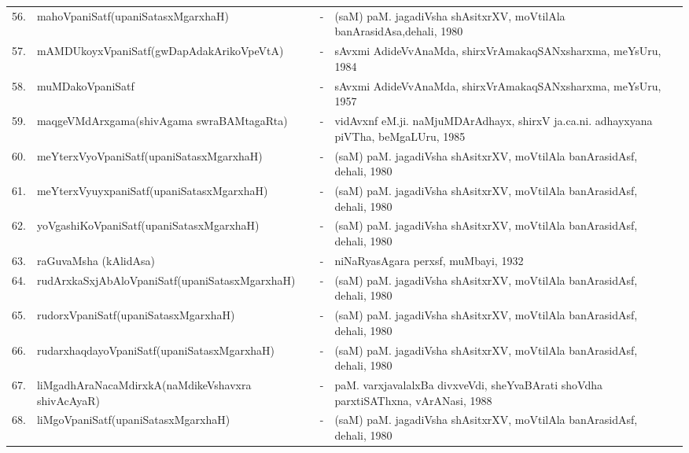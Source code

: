 {\begin{longtable}{lp{5cm}cp{5cm}<{\raggedright}p{3cm}<{\raggedright}@{}}
56. & mahoVpaniSatf\newline (upaniSatasxMgarxhaH) &-& (saM) paM. jagadiVsha shAsitxrXV, moVtilAla banArasidAsa,\newline dehali, 1980\\
57. & mAMDUkoyxVpaniSatf\newline (gwDapAdakArikoVpeVtA) &-& sAvxmi AdideVvAnaMda, shirxVrAmakaqSANxsharxma, meYsUru, 1984\\
58. & muMDakoVpaniSatf &-& sAvxmi AdideVvAnaMda, shirxVrAmakaqSANxsharxma, meYsUru, 1957\\
59. & maqgeVMdArxgama\newline (shivAgama swraBAMtagaRta) &-& vidAvxnf eM.ji. naMjuMDArAdhayx, shirxV ja.ca.ni. adhayxyana piVTha, beMgaLUru, 1985\\
60. & meYterxVyoVpaniSatf\newline (upaniSatasxMgarxhaH) &-& (saM) paM. jagadiVsha shAsitxrXV, moVtilAla banArasidAsf, dehali, 1980\\
61. & meYterxVyuyxpaniSatf\newline (upaniSatasxMgarxhaH) &-& (saM) paM. jagadiVsha shAsitxrXV, moVtilAla banArasidAsf, dehali, 1980\\
62. & yoVgashiKoVpaniSatf\newline (upaniSatasxMgarxhaH) &-& (saM) paM. jagadiVsha shAsitxrXV, moVtilAla banArasidAsf, dehali, 1980\\
63. & raGuvaMsha (kAlidAsa) &-& niNaRyasAgara perxsf, muMbayi, 1932\\
64. & rudArxkaSxjAbAloVpaniSatf\newline (upaniSatasxMgarxhaH) &-& (saM) paM. jagadiVsha shAsitxrXV, moVtilAla banArasidAsf, dehali, 1980\\
65. & rudorxVpaniSatf\newline (upaniSatasxMgarxhaH) &-& (saM) paM. jagadiVsha shAsitxrXV, moVtilAla banArasidAsf, dehali, 1980\\
66. & rudarxhaqdayoVpaniSatf\newline (upaniSatasxMgarxhaH) &-& (saM) paM. jagadiVsha shAsitxrXV, moVtilAla banArasidAsf, dehali, 1980\\
67. & liMgadhAraNacaMdirxkA\newline (naMdikeVshavxra shivAcAyaR) &-& paM. varxjavalalxBa divxveVdi, sheYvaBArati shoVdha parxtiSAThxna, vArANasi, 1988\\
68. & liMgoVpaniSatf\newline (upaniSatasxMgarxhaH) &-& (saM) paM. jagadiVsha shAsitxrXV, moVtilAla banArasidAsf, dehali, 1980\\

\end{longtable}}
